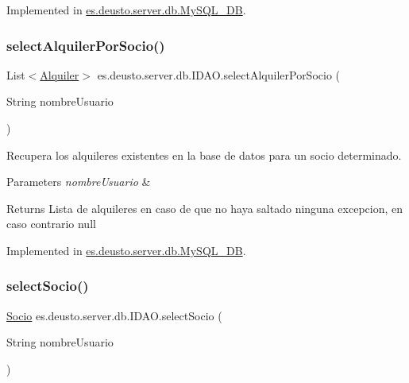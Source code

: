 Implemented in \mbox{\hyperlink{classes_1_1deusto_1_1server_1_1db_1_1_my_s_q_l___d_b_a96de9a556e05d6e04a2cb4553674a3ff}{es.\+deusto.\+server.\+db.\+My\+S\+Q\+L\+\_\+\+DB}}.

\mbox{\label{interfacees_1_1deusto_1_1server_1_1db_1_1_i_d_a_o_ab8723905772b63f54902859f45bd121b}} 
\subsubsection{\texorpdfstring{selectAlquilerPorSocio()}{selectAlquilerPorSocio()}}
{\footnotesize\ttfamily List$<$\mbox{\hyperlink{classes_1_1deusto_1_1client_1_1data_1_1_alquiler}{Alquiler}}$>$ es.\+deusto.\+server.\+db.\+I\+D\+A\+O.\+select\+Alquiler\+Por\+Socio (\begin{DoxyParamCaption}\item[{String}]{nombre\+Usuario }\end{DoxyParamCaption})}

Recupera los alquileres existentes en la base de datos para un socio determinado. 
\begin{DoxyParams}{Parameters}
{\em nombre\+Usuario} & \\
\hline
\end{DoxyParams}
\begin{DoxyReturn}{Returns}
Lista de alquileres en caso de que no haya saltado ninguna excepcion, en caso contrario null 
\end{DoxyReturn}


Implemented in \mbox{\hyperlink{classes_1_1deusto_1_1server_1_1db_1_1_my_s_q_l___d_b_a0b29a31e081a796511d06da22eece230}{es.\+deusto.\+server.\+db.\+My\+S\+Q\+L\+\_\+\+DB}}.

\mbox{\label{interfacees_1_1deusto_1_1server_1_1db_1_1_i_d_a_o_ab8bc0f83a9306dbd0f98601420cac890}} 
\subsubsection{\texorpdfstring{selectSocio()}{selectSocio()}}
{\footnotesize\ttfamily \mbox{\hyperlink{classes_1_1deusto_1_1client_1_1data_1_1_socio}{Socio}} es.\+deusto.\+server.\+db.\+I\+D\+A\+O.\+select\+Socio (\begin{DoxyParamCaption}\item[{String}]{nombre\+Usuario }\end{DoxyParamCaption})}

